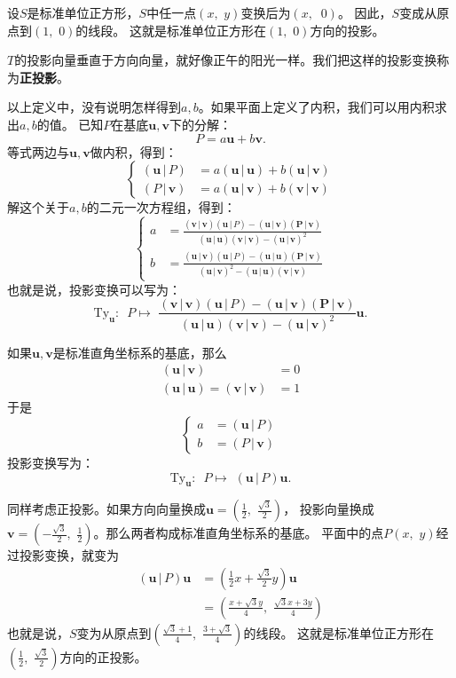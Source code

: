 \documentclass[12pt,UTF8]{ctexbook}
\theoremstyle{definition}
\theoremstyle{plain}
\begin{document}
设$S$是标准单位正方形，$S$中任一点$(x,\,\,y)$变换后为$(x,\,\,\ 0)$。
因此，$S$变成从原点到$(1,\,\,0)$的线段。
这就是标准单位正方形在$(1,\,\,0)$方向的投影。

$T$的投影向量垂直于方向向量，就好像正午的阳光一样。我们把这样的投影变换称为\textbf{正投影}。

以上定义中，没有说明怎样得到$a, b$。如果平面上定义了内积，我们可以用内积求出$a, b$的值。
已知$P$在基底$\mathbf{u}, \mathbf{v}$下的分解：
$$ P = a\mathbf{u} + b\mathbf{v}.$$
等式两边与$\mathbf{u}, \mathbf{v}$做内积，得到：
$$ 
  \left\{ \begin{array}{lc}
    (\mathbf{u}\,|\,P) &= a(\mathbf{u}\,|\,\mathbf{u}) + b(\mathbf{u}\,|\,\mathbf{v}) \\
    (P\,|\,\mathbf{v}) &= a(\mathbf{u}\,|\,\mathbf{v}) + b(\mathbf{v}\,|\,\mathbf{v})
  \end{array}\right.
$$
解这个关于$a, b$的二元一次方程组，得到：
$$ 
  \left\{ \begin{array}{cc}
    a &= \frac{(\mathbf{v}\,|\,\mathbf{v})(\mathbf{u}\,|\,P) - (\mathbf{u}\,|\,\mathbf{v})(\mathbf{P}\,|\,\mathbf{v})}{(\mathbf{u}\,|\,\mathbf{u})(\mathbf{v}\,|\,\mathbf{v}) - (\mathbf{u}\,|\,\mathbf{v})^2} \\
    b &= \frac{(\mathbf{u}\,|\,\mathbf{v})(\mathbf{u}\,|\,P) - (\mathbf{u}\,|\,\mathbf{u})(\mathbf{P}\,|\,\mathbf{v})}{(\mathbf{u}\,|\,\mathbf{v})^2 - (\mathbf{u}\,|\,\mathbf{u})(\mathbf{v}\,|\,\mathbf{v})}
  \end{array}\right.
$$
也就是说，投影变换可以写为：
$$ \mathrm{Ty}_\mathbf{u} :\,\,\, P \mapsto \,\, \frac{(\mathbf{v}\,|\,\mathbf{v})(\mathbf{u}\,|\,P) - (\mathbf{u}\,|\,\mathbf{v})(\mathbf{P}\,|\,\mathbf{v})}{(\mathbf{u}\,|\,\mathbf{u})(\mathbf{v}\,|\,\mathbf{v}) - (\mathbf{u}\,|\,\mathbf{v})^2}\mathbf{u}. $$

如果$\mathbf{u}, \mathbf{v}$是标准直角坐标系的基底，那么
\begin{align*}
    (\mathbf{u}\,|\,\mathbf{v}) &= 0  \\
    (\mathbf{u}\,|\,\mathbf{u}) = (\mathbf{v}\,|\,\mathbf{v}) &= 1 
\end{align*}
于是
$$ 
  \left\{ \begin{array}{lc}
    a &= (\mathbf{u}\,|\,P) \\
    b &= (P\,|\,\mathbf{v})
  \end{array}\right.
$$
投影变换写为：
$$ \mathrm{Ty}_\mathbf{u} :\,\,\, P \mapsto \,\, (\mathbf{u}\,|\,P)\mathbf{u}. $$

同样考虑正投影。如果方向向量换成$\mathbf{u} = \left(\frac{1}{2},\,\,\frac{\sqrt{3}}{2}\right)$，
投影向量换成$\mathbf{v} = \left(-\frac{\sqrt{3}}{2},\,\,\frac{1}{2}\right)$。那么两者构成标准直角坐标系的基底。
平面中的点$P(x,\,\,y)$经过投影变换，就变为
\begin{align*}
    (\mathbf{u}\,|\,P)\mathbf{u} &= \left(\frac{1}{2}x + \frac{\sqrt{3}}{2}y\right)\mathbf{u}  \\
    &= \left(\frac{x + \sqrt{3}y}{4},\,\, \frac{\sqrt{3}x + 3y}{4}\right) 
\end{align*}
也就是说，$S$变为从原点到$\left(\frac{\sqrt{3} + 1}{4},\,\,\frac{3 + \sqrt{3}}{4}\right)$的线段。
这就是标准单位正方形在$\left(\frac{1}{2},\,\,\frac{\sqrt{3}}{2}\right)$方向的正投影。
\end{document}
